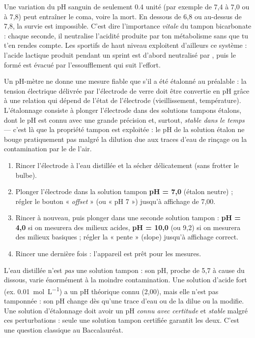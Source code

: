 \documentclass[11pt]{article}
\newcommand{\cle}[1]{{\popxbold\color{popdark}#1}}
\newcounter{popsec}
\newcounter{popsub}
\newcommand{\courssub}[1]{%
  \stepcounter{popsub}%
  \par\vspace{9pt}\noindent{\popxbold\fontsize{11.5}{13}\selectfont\color{popink}{\color{poporange}\thepopsec.\thepopsub}\hspace{6pt}#1}\par\nopagebreak\vspace{4pt}
}
\begin{document}
\begin{savaistu}
Une variation du pH sanguin de seulement \num{0,4} unité (par exemple de 7,4 à 7,0 ou à 7,8) peut entraîner le coma, voire la mort. En dessous de 6,8 ou au-dessus de 7,8, la survie est impossible. C'est dire l'importance \emph{vitale} du tampon bicarbonate : chaque seconde, il neutralise l'acidité produite par ton métabolisme sans que tu t'en rendes compte. Les sportifs de haut niveau exploitent d'ailleurs ce système : l'acide lactique produit pendant un sprint est d'abord neutralisé par , puis le  formé est évacué par l'essoufflement qui suit l'effort.
\end{savaistu}

\courssub{L'étalonnage des pH-mètres}

Un pH-mètre ne donne une mesure fiable que s'il a été \cle{étalonné} au préalable : la tension électrique délivrée par l'électrode de verre doit être convertie en pH grâce à une relation qui dépend de l'état de l'électrode (vieillissement, température). L'étalonnage consiste à plonger l'électrode dans des \cle{solutions tampons étalons}, dont le pH est connu avec une grande précision et, surtout, \emph{stable dans le temps} — c'est là que la propriété tampon est exploitée : le pH de la solution étalon ne bouge pratiquement pas malgré la dilution due aux traces d'eau de rinçage ou la contamination par le  de l'air.

\begin{methode}
\begin{enumerate}
\item Rincer l'électrode à l'eau distillée et la sécher délicatement (sans frotter le bulbe).
\item Plonger l'électrode dans la solution tampon \textbf{pH = 7,0} (étalon neutre) ; régler le bouton « \emph{offset} » (ou « pH 7 ») jusqu'à affichage de 7,00.
\item Rincer à nouveau, puis plonger dans une seconde solution tampon : \textbf{pH = 4,0} si on mesurera des milieux acides, \textbf{pH = 10,0} (ou 9,2) si on mesurera des milieux basiques ; régler la « pente » (slope) jusqu'à affichage correct.
\item Rincer une dernière fois : l'appareil est prêt pour les mesures.
\end{enumerate}
\end{methode}

\begin{attention}
L'eau distillée n'est \emph{pas} une solution tampon : son pH, proche de 5,7 à cause du  dissous, varie énormément à la moindre contamination. Une solution d'acide fort (ex.  \SI{0,01}{mol.L^{-1}}) a un pH théorique connu (2,00), mais elle n'est pas tamponnée : son pH change dès qu'une trace d'eau ou de  la dilue ou la modifie. Une solution d'étalonnage doit avoir un pH \emph{connu avec certitude} et \emph{stable} malgré ces perturbations : seule une solution tampon certifiée garantit les deux. C'est une question classique au Baccalauréat.
\end{attention}
\end{document}
